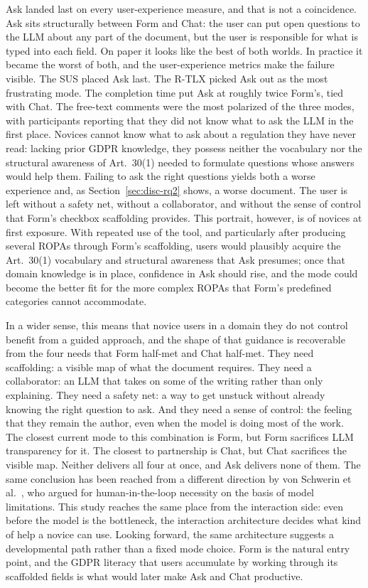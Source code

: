 Ask landed last on every user-experience measure, and that is
not a coincidence. Ask sits structurally between Form and Chat:
the user can put open questions to the LLM about any part of the
document, but the user is responsible for what is typed into
each field. On paper it looks like the best of both worlds. In
practice it became the worst of both, and the user-experience
metrics make the failure visible. The SUS placed Ask last. The
R-TLX picked Ask out as the most frustrating mode. The
completion time put Ask at roughly twice Form's, tied with Chat.
The free-text comments were the most polarized of the three
modes, with participants reporting that they did not know what
to ask the LLM in the first place.
Novices cannot know what to ask about a regulation they have never read:
lacking prior GDPR knowledge, they possess neither the vocabulary nor
the structural awareness of Art.~30(1) needed to formulate questions
whose answers would help them.
Failing to ask the right questions yields both
a worse experience and, as Section~\ref{sec:disc-rq2} shows, a
worse document. The user is left without a safety net, without
a collaborator, and without the sense of control that Form's
checkbox scaffolding provides.
This portrait, however, is of novices at first exposure. With
repeated use of the tool, and particularly after producing
several ROPAs through Form's scaffolding, users would
plausibly acquire the Art.~30(1) vocabulary and structural
awareness that Ask presumes; once that domain knowledge is in
place, confidence in Ask should rise, and the mode could
become the better fit for the more complex ROPAs that Form's
predefined categories cannot accommodate.

In a wider sense, this means that novice users in a domain
they do not control benefit from a guided approach, and the
shape of that guidance is recoverable from the four needs that
Form half-met and Chat half-met. They need scaffolding: a
visible map of what the document requires. They need a
collaborator: an LLM that takes on some of the writing rather
than only explaining. They need a safety net: a way to get
unstuck without already knowing the right question to ask. And
they need a sense of control: the feeling that they remain the
author, even when the model is doing most of the work. The
closest current mode to this combination is Form, but Form
sacrifices LLM transparency for it. The closest to partnership
is Chat, but Chat sacrifices the visible map. Neither delivers
all four at once, and Ask delivers none of them. The same
conclusion has been reached from a different direction by von
Schwerin et al.~\cite{schwerinSystematicComparisonOpen2024}, who
argued for human-in-the-loop necessity on the basis of model
limitations. This study reaches the same place from the
interaction side: even before the model is the bottleneck, the
interaction architecture decides what kind of help a novice
can use. Looking forward, the same architecture suggests a
developmental path rather than a fixed mode choice. Form is
the natural entry point, and the GDPR literacy that users
accumulate by working through its scaffolded fields is what
would later make Ask and Chat productive.


